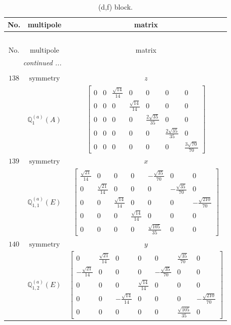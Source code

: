 \documentclass[fleqn,8pt,landscape]{jsarticle}
\begin{document}
\begin{longtable}{ccc}
\caption{(d,f) block.}
 \\
 \hline \hline
No. & multipole & matrix \\ \hline \endfirsthead

\multicolumn{2}{l}{\tablename\ \thetable{}} \\
 \hline \hline
No. & multipole & matrix \\ \hline \endhead

 \hline \hline
\multicolumn{2}{r}{\footnotesize\it continued ...} \\ \endfoot

 \hline \hline
\multicolumn{2}{r}{} \\ \endlastfoot

$ 138 $ & $ \text{symmetry} $ & $ z $ \\
$  $ & $ \mathbb{Q}_{1}^{(a)}(A) $ & $ \begin{bmatrix} 0 & 0 & \frac{\sqrt{14}}{14} & 0 & 0 & 0 & 0 \\ 0 & 0 & 0 & \frac{\sqrt{14}}{14} & 0 & 0 & 0 \\ 0 & 0 & 0 & 0 & \frac{2 \sqrt{35}}{35} & 0 & 0 \\ 0 & 0 & 0 & 0 & 0 & \frac{2 \sqrt{35}}{35} & 0 \\ 0 & 0 & 0 & 0 & 0 & 0 & \frac{3 \sqrt{70}}{70} \end{bmatrix} $ \\ \hline
$ 139 $ & $ \text{symmetry} $ & $ x $ \\
$  $ & $ \mathbb{Q}_{1,1}^{(a)}(E) $ & $ \begin{bmatrix} \frac{\sqrt{21}}{14} & 0 & 0 & 0 & - \frac{\sqrt{35}}{70} & 0 & 0 \\ 0 & \frac{\sqrt{21}}{14} & 0 & 0 & 0 & - \frac{\sqrt{35}}{70} & 0 \\ 0 & 0 & \frac{\sqrt{14}}{14} & 0 & 0 & 0 & - \frac{\sqrt{210}}{70} \\ 0 & 0 & 0 & \frac{\sqrt{14}}{14} & 0 & 0 & 0 \\ 0 & 0 & 0 & 0 & \frac{\sqrt{105}}{35} & 0 & 0 \end{bmatrix} $ \\ \hline
$ 140 $ & $ \text{symmetry} $ & $ y $ \\
$  $ & $ \mathbb{Q}_{1,2}^{(a)}(E) $ & $ \begin{bmatrix} 0 & \frac{\sqrt{21}}{14} & 0 & 0 & 0 & \frac{\sqrt{35}}{70} & 0 \\ - \frac{\sqrt{21}}{14} & 0 & 0 & 0 & - \frac{\sqrt{35}}{70} & 0 & 0 \\ 0 & 0 & 0 & \frac{\sqrt{14}}{14} & 0 & 0 & 0 \\ 0 & 0 & - \frac{\sqrt{14}}{14} & 0 & 0 & 0 & - \frac{\sqrt{210}}{70} \\ 0 & 0 & 0 & 0 & 0 & \frac{\sqrt{105}}{35} & 0 \end{bmatrix} $ \\ \hline

\end{longtable}
\end{document}
